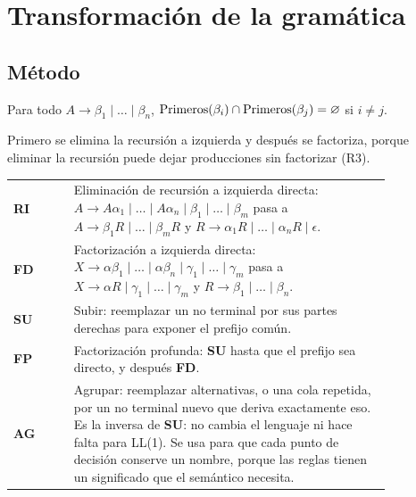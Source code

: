 \documentclass[12pt,a4paper]{article}
\newcommand{\tec}[1]{\textsf{\bfseries #1}}
\begin{document}
\section{Transformación de la gramática}
\label{sec:transformaciones}

\subsection{Método}

 Para todo $A \to \beta_1 \mid \dots \mid \beta_n$,
$\textup{Primeros}(\beta_i) \cap \textup{Primeros}(\beta_j) = \varnothing$ si $i \neq j$.

 Primero se elimina la recursión a izquierda y después se factoriza, porque eliminar la
recursión puede dejar producciones sin factorizar (R3).


\begin{center}\small
\begin{tabular}{@{}l>{\raggedright\arraybackslash}p{0.84\linewidth}@{}}
\toprule
\tec{RI} & Eliminación de recursión a izquierda directa:
$A \to A\alpha_1 \mid \dots \mid A\alpha_n \mid \beta_1 \mid \dots \mid \beta_m$ pasa a
$A \to \beta_1 R \mid \dots \mid \beta_m R$ y $R \to \alpha_1 R \mid \dots \mid \alpha_n R \mid \epsilon$. \\
\tec{FD} & Factorización a izquierda directa:
$X \to \alpha\beta_1 \mid \dots \mid \alpha\beta_n \mid \gamma_1 \mid \dots \mid \gamma_m$ pasa a
$X \to \alpha R \mid \gamma_1 \mid \dots \mid \gamma_m$ y $R \to \beta_1 \mid \dots \mid \beta_n$. \\
\tec{SU} & Subir: reemplazar un no terminal por sus partes derechas para exponer el prefijo común. \\
\tec{FP} & Factorización profunda: \tec{SU} hasta que el prefijo sea directo, y después \tec{FD}. \\
\tec{AG} & Agrupar: reemplazar alternativas, o una cola repetida, por un no terminal nuevo que deriva
exactamente eso. Es la inversa de \tec{SU}: no cambia el lenguaje ni hace falta para LL(1). Se usa
para que cada punto de decisión conserve un nombre, porque las reglas tienen un significado que el
semántico necesita. \\
\bottomrule
\end{tabular}
\end{center}
\end{document}
